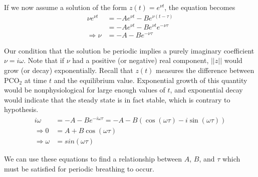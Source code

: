 If we now assume a solution of the form $z(t) = e^{\nu t}$, the equation becomes
\begin{align*}
  \nu e^{\nu t} &= -A e^{\nu t} - B e^{\nu (t-\tau)}\\
  &= -A e^{\nu t} - B e^{\nu t}e^{-\nu \tau}\\
  \Rightarrow \nu &= -A -B e^{-\nu\tau}
\end{align*}

Our condition that the solution be periodic implies a purely imaginary coefficient $\nu = i\omega$. Note that if $\nu$ had a positive (or negative) real component, $||z||$ would grow (or decay) exponentially. Recall that $z(t)$ measures the difference between $\mathrm{PCO}_2$ at time $t$ and the equilibrium value. Exponential growth of this quantity would be nonphysiological for large enough values of $t$, and exponential decay would indicate that the steady state is in fact stable, which is contrary to hypothesis.
\begin{align*}
  i\omega &= -A -B e^{-i\omega \tau} = -A - B \left(\cos(\omega\tau)-i\sin(\omega\tau)\right)\\
  \Rightarrow 0 &= A + B\cos(\omega\tau)\\
  \Rightarrow \omega &= sin(\omega\tau)
\end{align*}

We can use these equations to find a relationship between $A$, $B$, and $\tau$ which must be satisfied for periodic breathing to occur.
